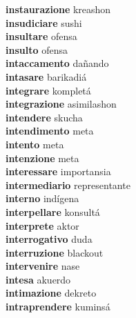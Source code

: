 \textbf{instaurazione } kreashon \\
\textbf{insudiciare } sushi \\
\textbf{insultare } ofensa \\
\textbf{insulto } ofensa \\
\textbf{intaccamento } dañando \\
\textbf{intasare } barikadiá \\
\textbf{integrare } kompletá \\
\textbf{integrazione } asimilashon \\
\textbf{intendere } skucha \\
\textbf{intendimento } meta \\
\textbf{intento } meta \\
\textbf{intenzione } meta \\
\textbf{interessare } importansia \\
\textbf{intermediario } representante \\
\textbf{interno } indígena \\
\textbf{interpellare } konsultá \\
\textbf{interprete } aktor \\
\textbf{interrogativo } duda \\
\textbf{interruzione } blackout \\
\textbf{intervenire } nase \\
\textbf{intesa } akuerdo \\
\textbf{intimazione } dekreto \\
\textbf{intraprendere } kuminsá \\
